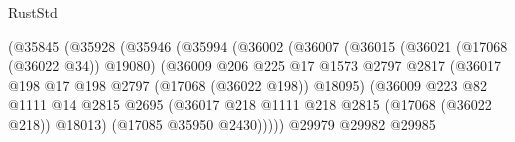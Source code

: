\begin{lexlean}{RustStd}
\begin{coremodule}
                                          (@35845
                                            (@35928
                                              (@35946
                                                (@35994
                                                  (@36002
                                                    (@36007
                                                      (@36015
                                                        (@36021 (@17068 (@36022 @34)) @19080)
                                                        (@36009
                                                          @206
                                                          @225
                                                          @17
                                                          @1573
                                                          @2797
                                                          @2817
                                                          (@36017
                                                            @198
                                                            @17
                                                            @198
                                                            @2797
                                                            (@17068 (@36022 @198))
                                                            @18095)
                                                          (@36009
                                                            @223
                                                            @82
                                                            @1111
                                                            @14
                                                            @2815
                                                            @2695
                                                            (@36017
                                                              @218
                                                              @1111
                                                              @218
                                                              @2815
                                                              (@17068 (@36022 @218))
                                                              @18013)
                                                            (@17085 @35950 @2430)))))
                                                    @29979
                                                    @29982
                                                    @29985

\end{coremodule}
\end{lexlean}
